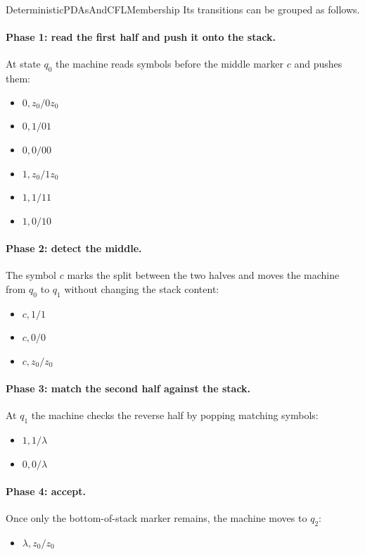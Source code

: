 \documentclass[hidelinks]{article}
\begin{document}
\begin{smodule}[title={Deterministic PDAs and CFL Membership}]{DeterministicPDAsAndCFLMembership}
Its transitions can be grouped as follows.

\paragraph{Phase 1: read the first half and push it onto the stack.}
At state $q_0$ the machine reads symbols before the middle marker $c$ and pushes them:
\begin{itemize}
    \item $0,z_0/0z_0$
    \item $0,1/01$
    \item $0,0/00$
    \item $1,z_0/1z_0$
    \item $1,1/11$
    \item $1,0/10$
\end{itemize}

\paragraph{Phase 2: detect the middle.}
The symbol $c$ marks the split between the two halves and moves the machine from $q_0$ to $q_1$ without changing the stack content:
\begin{itemize}
    \item $c,1/1$
    \item $c,0/0$
    \item $c,z_0/z_0$
\end{itemize}

\paragraph{Phase 3: match the second half against the stack.}
At $q_1$ the machine checks the reverse half by popping matching symbols:
\begin{itemize}
    \item $1,1/\lambda$
    \item $0,0/\lambda$
\end{itemize}

\paragraph{Phase 4: accept.}
Once only the bottom-of-stack marker remains, the machine moves to $q_2$:
\begin{itemize}
    \item $\lambda,z_0/z_0$
\end{itemize}


\end{smodule}
\end{document}
